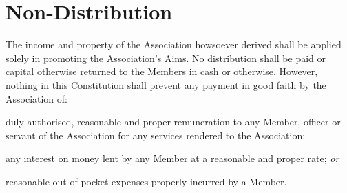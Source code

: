 \documentclass[12pt]{article}
\newcommand{\ITor}[0]{\textit{or}}
\begin{document}

\section{Non-Distribution}

  The income and property of the Association howsoever derived shall be
  applied solely in promoting the Association’s Aims. No distribution shall
  be paid or capital otherwise returned to the Members in cash or otherwise.
  However, nothing in this Constitution shall prevent any payment in good
  faith by the Association of:
  \begin{constenum}
  \item duly authorised, reasonable and proper remuneration to any Member,
    officer or servant of the Association for any services rendered to the
    Association;
  \item any interest on money lent by any Member at a reasonable and proper
    rate; \ITor
  \item reasonable out-of-pocket expenses properly incurred by a Member.
  \end{constenum}


\end{document}
